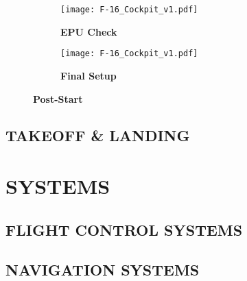 \documentclass[fontInter]{TechCheck}
\begin{document}
	\begin{figure}[h]
		\centering
		\begin{subfigure}[t]{0.45\linewidth}
			\centering
			\texttt{[image: F-16\_Cockpit\_v1.pdf]}
			\caption*{\textbf{EPU Check}}
		\end{subfigure}
		\begin{subfigure}[t]{0.45\linewidth}
			\centering
			\texttt{[image: F-16\_Cockpit\_v1.pdf]}
			\caption*{\textbf{Final Setup}}
		\end{subfigure}
		\caption{\textbf{Post-Start}}
		\label{fig:proc:poststart5}
	\end{figure}

	\clearpage


	\clearpage
	
	\section{TAKEOFF \& LANDING}

	

	\cleardoublepage

	\chapter{SYSTEMS}
	\minitoc
	\cleardoublepage

	\section{FLIGHT CONTROL SYSTEMS}

	\clearpage

	\section{NAVIGATION SYSTEMS}
\end{document}
